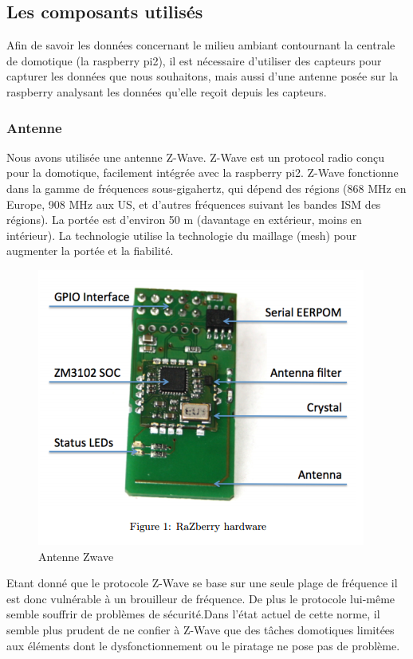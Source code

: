 \subsection{Les composants utilisés}
Afin de savoir les données concernant le milieu ambiant contournant la centrale de domotique (la raspberry pi2), il est nécessaire d'utiliser des capteurs pour capturer les données que nous souhaitons, mais aussi d'une antenne posée sur la raspberry analysant les données qu'elle reçoit depuis les capteurs.

\subsubsection{Antenne}
Nous avons utilisée une antenne Z-Wave. Z-Wave est un protocol radio conçu pour la domotique, facilement intégrée avec la raspberry pi2. Z-Wave fonctionne dans la gamme de fréquences sous-gigahertz, qui dépend des régions (868 MHz en Europe, 908 MHz aux US, et d'autres fréquences suivant les bandes ISM des régions). La portée est d'environ 50 m (davantage en extérieur, moins en intérieur). La technologie utilise la technologie du maillage (mesh) pour augmenter la portée et la fiabilité.

\begin{figure}[h]
	\center
	\includegraphics[scale=0.5]{./Images/png/Zwave.png}\newline
	\caption{Antenne Zwave}
\end{figure}

Etant donné que le protocole Z-Wave se base sur une seule plage de fréquence il est donc vulnérable à un brouilleur de fréquence.
 De plus le protocole lui-même semble souffrir de problèmes de sécurité.Dans l'état actuel de cette norme, il semble plus prudent de ne confier à Z-Wave que des tâches domotiques limitées aux éléments dont le dysfonctionnement ou le piratage ne pose pas de problème.
